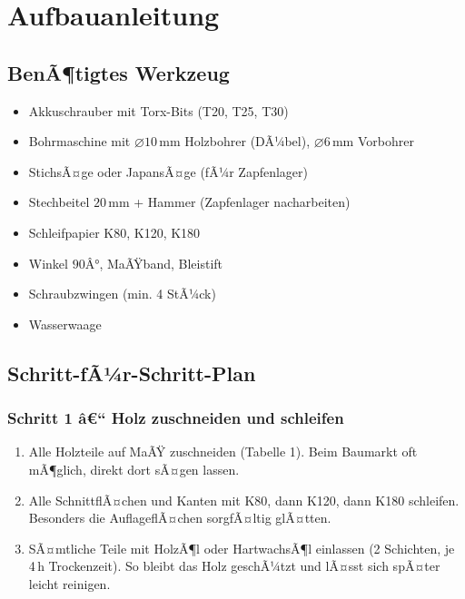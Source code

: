 ﻿\documentclass[12pt,a4paper]{article}
\theoremstyle{definition}
\theoremstyle{plain}
\theoremstyle{remark}
\begin{document}
\section{Aufbauanleitung}

\subsection{BenÃ¶tigtes Werkzeug}

\begin{itemize}[nosep]
  \item Akkuschrauber mit Torx-Bits (T20, T25, T30)
  \item Bohrmaschine mit $\varnothing 10\,\text{mm}$ Holzbohrer (DÃ¼bel), $\varnothing 6\,\text{mm}$ Vorbohrer
  \item StichsÃ¤ge oder JapansÃ¤ge (fÃ¼r Zapfenlager)
  \item Stechbeitel $20\,\text{mm}$ + Hammer (Zapfenlager nacharbeiten)
  \item Schleifpapier K80, K120, K180
  \item Winkel $90Â°$, MaÃŸband, Bleistift
  \item Schraubzwingen (min. 4 StÃ¼ck)
  \item Wasserwaage
\end{itemize}

\subsection{Schritt-fÃ¼r-Schritt-Plan}

\subsubsection*{Schritt 1 â€“ Holz zuschneiden und schleifen}

\begin{enumerate}
  \item Alle Holzteile auf MaÃŸ zuschneiden (Tabelle 1). Beim Baumarkt
        oft mÃ¶glich, direkt dort sÃ¤gen lassen.
  \item Alle SchnittflÃ¤chen und Kanten mit K80, dann K120, dann K180
        schleifen. Besonders die AuflageflÃ¤chen sorgfÃ¤ltig glÃ¤tten.
  \item SÃ¤mtliche Teile mit HolzÃ¶l oder HartwachsÃ¶l einlassen
        (2 Schichten, je 4\,h Trockenzeit). So bleibt das Holz geschÃ¼tzt
        und lÃ¤sst sich spÃ¤ter leicht reinigen.
\end{enumerate}
\end{document}
